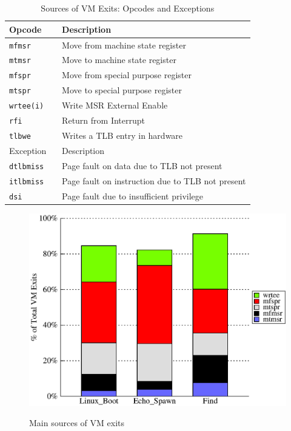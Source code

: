 \documentclass[10pt,twocolumn]{article}
\begin{document}
\begin{table}[!b]
\centering
     \begin{tabular}{|l | p{5cm} |} \hline
       Opcode \verb, , & Description \\ \hline
       {\tt mfmsr} & Move from machine state register \\ \hline
       {\tt mtmsr} & Move to machine state register \\\hline
       {\tt mfspr} & Move from special purpose register \\\hline
       {\tt mtspr} & Move to special purpose register \\\hline
       {\tt wrtee(i)} & Write MSR External Enable  \\\hline
       {\tt rfi} & Return from Interrupt \\\hline
       {\tt tlbwe} & Writes a TLB entry in hardware\\\hline
       \hline
       Exception \verb, , & Description \\ \hline
       {\tt dtlbmiss} & Page fault on data due to TLB not present\\    \hline
       {\tt itlbmiss} & Page fault on instruction due to TLB not present\\    \hline
       {\tt dsi} & Page fault due to insufficient privilege\\\hline

     \end{tabular}
\caption{\label{tab:priv_opcodes} Sources of VM Exits: Opcodes and Exceptions}
\end{table}

\begin{figure}[!htb]
\centering

\includegraphics[scale=0.5]{exit_count.eps}
\label{fig:opcode_exit_fraction}
\caption{Main sources of VM exits}
\end{figure}
\end{document}
